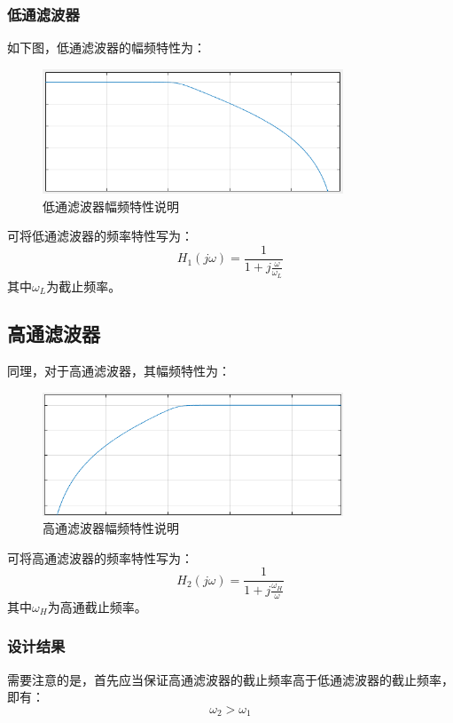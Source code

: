 \documentclass[11pt]{article}
\begin{document}
\subsubsection{低通滤波器}
如下图，低通滤波器的幅频特性为：
\begin{figure}[H]
  \centering
  \includegraphics[width=0.8\textwidth]{低通滤波器.png}
  \caption{低通滤波器幅频特性说明}
  \label{fig:低通滤波器}
\end{figure}

可将低通滤波器的频率特性写为：
\begin{displaymath}
  H_1(j\omega)=\frac{1}{\displaystyle 1+j\frac{\omega}{\omega_L}}
\end{displaymath}
其中$\omega_L$为截止频率。
\subsection{高通滤波器}
同理，对于高通滤波器，其幅频特性为：
\begin{figure}[H]
  \centering
  \includegraphics[width=0.8\textwidth]{高通滤波器.png}
  \caption{高通滤波器幅频特性说明}
  \label{fig:高通滤波器}
\end{figure}
可将高通滤波器的频率特性写为：
\begin{displaymath}
  H_2(j\omega)=\frac{1}{\displaystyle 1+j\frac{\omega_H}{\omega}}
\end{displaymath}
其中$\omega_H$为高通截止频率。
\subsubsection{设计结果}
需要注意的是，首先应当保证高通滤波器的截止频率高于低通滤波器的截止频率，即有：
\begin{equation*}
  \omega_2>\omega_1
\end{equation*}
\end{document}
